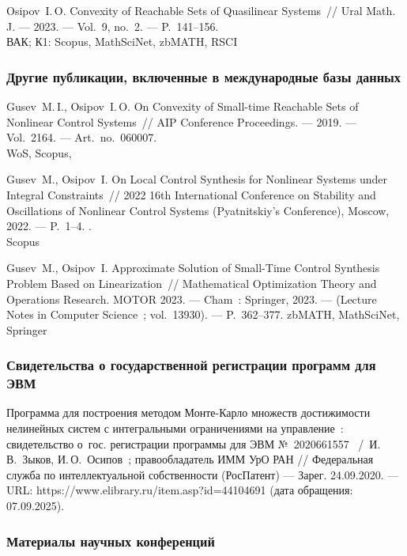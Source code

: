 \documentclass[../main.tex]{subfiles}
\begin{document}
\begin{thebibliography}{99}
Osipov~I.\,O. Convexity of Reachable Sets of Quasilinear Systems~// Ural Math. J. --- 2023. --- Vol.~9, no.~2. --- P.~141--156.
 \\
ВАК; К1: Scopus, MathSciNet, zbMATH, RSCI


\subsubsection*{Другие публикации, включенные в международные базы данных}
Gusev~M.\,I., Osipov~I.\,O. On Convexity of Small-time Reachable Sets of Nonlinear Control Systems~// AIP Conference Proceedings. --- 2019. --- Vol.~2164. --- Art.~no.~060007.
 \\
WoS, Scopus,

Gusev~M., Osipov~I. On Local Control Synthesis for Nonlinear Systems under Integral Constraints~// 2022 16th International Conference on Stability and Oscillations of Nonlinear Control Systems (Pyatnitskiy's Conference), Moscow, 2022. --- P.~1--4. .\\
Scopus

Gusev~M., Osipov~I. Approximate Solution of Small-Time Control Synthesis Problem Based on Linearization~// Mathematical Optimization Theory and Operations Research. MOTOR 2023. --- Cham~: Springer, 2023. --- (Lecture Notes in Computer Science~; vol.~13930). --- P.~362--377.
zbMATH, MathSciNet, Springer

\subsubsection*{Свидетельства о государственной регистрации программ для ЭВМ}
Программа для построения методом Монте-Карло множеств достижимости нелинейных систем с интегральными ограничениями на управление~: свидетельство о~гос. регистрации программы для ЭВМ №~2020661557 ~/~И.\,В.~Зыков, И.\,О.~Осипов~; правообладатель ИММ УрО РАН // Федеральная служба по интеллектуальной собственности (РосПатент) --- Зарег. 24.09.2020. --- URL: https://www.elibrary.ru/item.asp?id=44104691 (дата обращения: 07.09.2025).

\subsubsection*{Материалы научных конференций}


\end{thebibliography}
\end{document}
